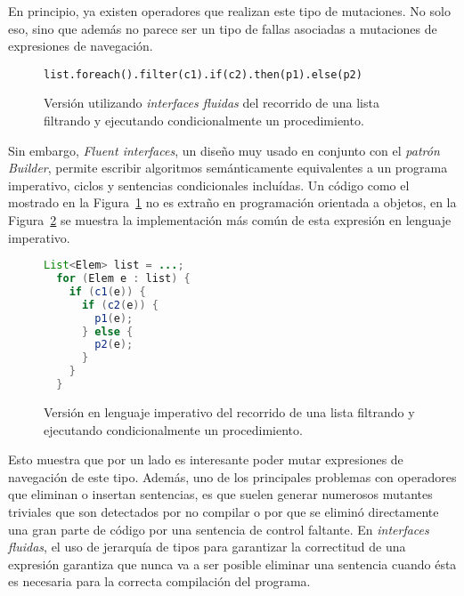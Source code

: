 En principio, ya existen operadores que realizan este tipo de mutaciones. No solo eso, sino que adem\'as no parece ser un tipo de fallas asociadas a mutaciones de expresiones de navegaci\'on.

\begin{figure}
	\begin{lstlisting}[frame=single, mathescape=true,xleftmargin=0.012\textwidth,xrightmargin=0.012\textwidth,basicstyle={}]
  list.foreach().filter(c1).if(c2).then(p1).else(p2)
	\end{lstlisting}
	\caption{Versi\'on utilizando \emph{interfaces fluidas} del recorrido de una lista filtrando y ejecutando condicionalmente un procedimiento.}
	\label{figures.examples.fluent.example1.fluent}
\end{figure}

Sin embargo, \emph{Fluent interfaces}, un dise\~no muy usado en conjunto con el \emph{patr\'on Builder}, permite escribir algoritmos sem\'anticamente equivalentes a un programa imperativo, ciclos y sentencias condicionales inclu\'idas. Un c\'odigo como el mostrado en la Figura~\ref{figures.examples.fluent.example1.fluent} no es extra\~no en programaci\'on orientada a objetos, en la Figura~\ref{figures.examples.fluent.example1.imperative} se muestra la implementaci\'on m\'as com\'un de esta expresi\'on en lenguaje imperativo.

\begin{figure}
	\begin{lstlisting}[frame=single, mathescape=true,xleftmargin=0.012\textwidth,xrightmargin=0.012\textwidth,language=Java,basicstyle={}]
  List<Elem> list = ...;
  for (Elem e : list) {
    if (c1(e)) {
      if (c2(e)) {
        p1(e);
      } else {
        p2(e);
      }
    }
  }
	\end{lstlisting}
	\caption{Versi\'on en lenguaje imperativo del recorrido de una lista filtrando y ejecutando condicionalmente un procedimiento.}
	\label{figures.examples.fluent.example1.imperative}
\end{figure}

Esto muestra que por un lado es interesante poder mutar expresiones de navegaci\'on de este tipo. Adem\'as, uno de los principales problemas con operadores que eliminan o insertan sentencias, es que suelen generar numerosos mutantes triviales que son detectados por no compilar o por que se elimin\'o directamente una gran parte de c\'odigo por una sentencia de control faltante. En \emph{interfaces fluidas}, el uso de jerarqu\'ia de tipos para garantizar la correctitud de una expresi\'on garantiza que nunca va a ser posible eliminar una sentencia cuando \'esta es necesaria para la correcta compilaci\'on del programa.


